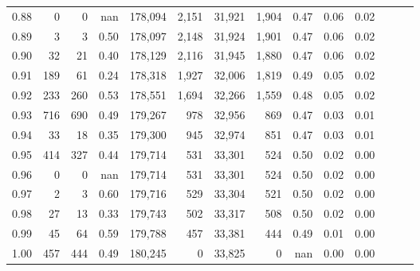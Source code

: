 \begin{tabular}{rrrrrrrrrrrrrr}
0.88 &       0 &      0 &   nan &  178,094 &    2,151 &  31,921 &   1,904 &  0.47 &  0.06 &      0.02 \\
0.89 &       3 &      3 &  0.50 &  178,097 &    2,148 &  31,924 &   1,901 &  0.47 &  0.06 &      0.02 \\
0.90 &      32 &     21 &  0.40 &  178,129 &    2,116 &  31,945 &   1,880 &  0.47 &  0.06 &      0.02 \\
0.91 &     189 &     61 &  0.24 &  178,318 &    1,927 &  32,006 &   1,819 &  0.49 &  0.05 &      0.02 \\
0.92 &     233 &    260 &  0.53 &  178,551 &    1,694 &  32,266 &   1,559 &  0.48 &  0.05 &      0.02 \\
0.93 &     716 &    690 &  0.49 &  179,267 &      978 &  32,956 &     869 &  0.47 &  0.03 &      0.01 \\
0.94 &      33 &     18 &  0.35 &  179,300 &      945 &  32,974 &     851 &  0.47 &  0.03 &      0.01 \\
0.95 &     414 &    327 &  0.44 &  179,714 &      531 &  33,301 &     524 &  0.50 &  0.02 &      0.00 \\
0.96 &       0 &      0 &   nan &  179,714 &      531 &  33,301 &     524 &  0.50 &  0.02 &      0.00 \\
0.97 &       2 &      3 &  0.60 &  179,716 &      529 &  33,304 &     521 &  0.50 &  0.02 &      0.00 \\
0.98 &      27 &     13 &  0.33 &  179,743 &      502 &  33,317 &     508 &  0.50 &  0.02 &      0.00 \\
0.99 &      45 &     64 &  0.59 &  179,788 &      457 &  33,381 &     444 &  0.49 &  0.01 &      0.00 \\
1.00 &     457 &    444 &  0.49 &  180,245 &        0 &  33,825 &       0 &   nan &  0.00 &      0.00 \\
\bottomrule
\end{tabular}
